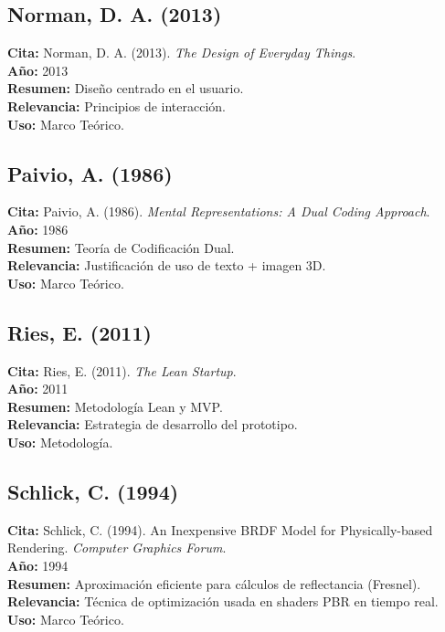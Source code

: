 \subsection*{Norman, D. A. (2013)}
\textbf{Cita:} Norman, D. A. (2013). \textit{The Design of Everyday Things}. \\
\textbf{Año:} 2013 \\
\textbf{Resumen:} Diseño centrado en el usuario. \\
\textbf{Relevancia:} Principios de interacción. \\
\textbf{Uso:} Marco Teórico.

\subsection*{Paivio, A. (1986)}
\textbf{Cita:} Paivio, A. (1986). \textit{Mental Representations: A Dual Coding Approach}. \\
\textbf{Año:} 1986 \\
\textbf{Resumen:} Teoría de Codificación Dual. \\
\textbf{Relevancia:} Justificación de uso de texto + imagen 3D. \\
\textbf{Uso:} Marco Teórico.

\subsection*{Ries, E. (2011)}
\textbf{Cita:} Ries, E. (2011). \textit{The Lean Startup}. \\
\textbf{Año:} 2011 \\
\textbf{Resumen:} Metodología Lean y MVP. \\
\textbf{Relevancia:} Estrategia de desarrollo del prototipo. \\
\textbf{Uso:} Metodología.

\subsection*{Schlick, C. (1994)}
\textbf{Cita:} Schlick, C. (1994). An Inexpensive BRDF Model for Physically-based Rendering. \textit{Computer Graphics Forum}. \\
\textbf{Año:} 1994 \\
\textbf{Resumen:} Aproximación eficiente para cálculos de reflectancia (Fresnel). \\
\textbf{Relevancia:} Técnica de optimización usada en shaders PBR en tiempo real. \\
\textbf{Uso:} Marco Teórico.

